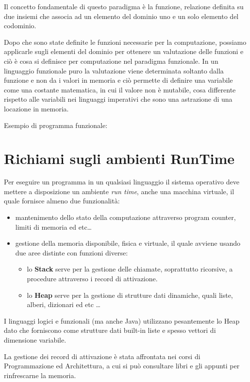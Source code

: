 \documentclass[a4paper]{book}
\begin{document}
Il concetto fondamentale di questo paradigma è la funzione, relazione definita su due insiemi che associa ad un elemento del dominio uno e
un solo elemento del codominio.

Dopo che sono state definite le funzioni necessarie per la computazione, possiamo applicarle sugli elementi del dominio
per ottenere un valutazione delle funzioni e ciò è cosa si definisce per computazione nel paradigma funzionale.\newline
In un linguaggio funzionale puro la valutazione viene determinata soltanto dalla funzione e non da i valori in memoria e
ciò permette di definire una variabile come una costante matematica, in cui il valore non è mutabile,
cosa differente rispetto alle variabili nei linguaggi imperativi che sono una astrazione di una locazione in memoria.

Esempio di programma funzionale:

\section{Richiami sugli ambienti RunTime}
Per eseguire un programma in un qualsiasi linguaggio il sistema operativo deve mettere a disposizione
un ambiente \textit{run time}, anche una macchina virtuale, il quale fornisce almeno due funzionalità:
\begin{itemize}
\item mantenimento dello stato della computazione attraverso program counter, limiti di memoria ed etc\dots
\item gestione della memoria disponibile, fisica e virtuale, il quale avviene usando due aree distinte con funzioni diverse:
      \begin{itemize}
      \item lo \textbf{Stack}  serve per la gestione delle chiamate, soprattutto ricorsive, a procedure attraverso i record di attivazione.
      \item lo \textbf{Heap} serve per la gestione di strutture dati dinamiche, quali liste, alberi, dizionari ed etc \dots
      \end{itemize}
\end{itemize}
I linguaggi logici e funzionali (ma anche Java) utilizzano pesantemente lo Heap dato che forniscono come strutture dati built-in
liste e spesso vettori di dimensione variabile.

La gestione dei record di attivazione è stata affrontata nei corsi di Programmazione ed Architettura, a cui si può consultare
libri e gli appunti per rinfrescarne la memoria.
\end{document}
